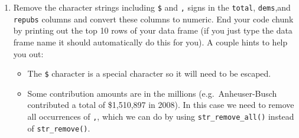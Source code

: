 \documentclass[
]{article}
\newenvironment{Shaded}{\begin{snugshade}}{\end{snugshade}}
\newcommand{\AttributeTok}[1]{\textcolor[rgb]{0.13,0.29,0.53}{#1}}
\newcommand{\CommentTok}[1]{\textcolor[rgb]{0.56,0.35,0.01}{\textit{#1}}}
\newcommand{\FunctionTok}[1]{\textcolor[rgb]{0.13,0.29,0.53}{\textbf{#1}}}
\newcommand{\NormalTok}[1]{#1}
\newcommand{\OtherTok}[1]{\textcolor[rgb]{0.56,0.35,0.01}{#1}}
\newcommand{\SpecialCharTok}[1]{\textcolor[rgb]{0.81,0.36,0.00}{\textbf{#1}}}
\newcommand{\StringTok}[1]{\textcolor[rgb]{0.31,0.60,0.02}{#1}}
\begin{document}
\begin{enumerate}
\def\labelenumi{\arabic{enumi}.}
\setcounter{enumi}{2}
\item
  Remove the character strings including \texttt{\$} and \texttt{,}
  signs in the \texttt{total}, \texttt{dems},and \texttt{repubs} columns
  and convert these columns to numeric. End your code chunk by printing
  out the top 10 rows of your data frame (if you just type the data
  frame name it should automatically do this for you). A couple hints to
  help you out:

  \begin{itemize}
  \item
    The \texttt{\$} character is a special character so it will need to
    be escaped.
  \item
    Some contribution amounts are in the millions (e.g.~Anheuser-Busch
    contributed a total of \$1,510,897 in 2008). In this case we need to
    remove all occurrences of \texttt{,}, which we can do by using
    \texttt{str\_remove\_all()} instead of \texttt{str\_remove()}.
  \end{itemize}
\end{enumerate}

\begin{Shaded}
\end{Shaded}
\end{document}
